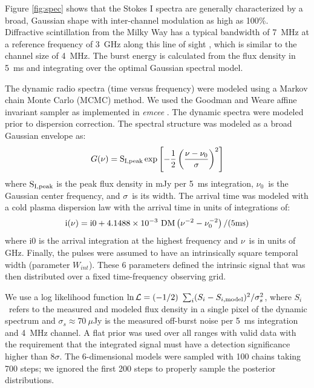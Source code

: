 \documentclass[twocolumn]{aastex61}
\begin{document}
Figure \ref{fig:spec} shows that the Stokes I spectra are generally characterized by a broad, Gaussian shape with inter-channel modulation as high as 100\%. Diffractive scintillation from the Milky Way has a typical bandwidth of 7~MHz at a reference frequency of 3~GHz along this line of sight \citep{2002astro.ph..7156C}, which is similar to the channel size of 4~MHz. The burst energy is calculated from the flux density in 5~ms and integrating over the optimal Gaussian spectral model.

The dynamic radio spectra (time versus frequency) were modeled using a Markov chain Monte Carlo (MCMC) method. We used the Goodman and Weare affine invariant sampler \citep{goodman2010ensemble} as implemented in \emph{emcee} \citep{2013PASP..125..306F}. The dynamic spectra were modeled prior to dispersion correction. The spectral structure was modeled as a broad Gaussian envelope as:
\begin{equation}
G(\nu) = \rm{S}_{I,peak} \exp{\left[-\frac{1}{2} \left(\frac{\nu - \nu_0}{\sigma}\right)^2\right]}
\end{equation}
\noindent where $\rm{S}_{I,peak}$ is the peak flux density in mJy per 5~ms integration, $\nu_0$\ is the Gaussian center frequency, and $\sigma$\ is its width. The arrival time was modeled with a cold plasma dispersion law with the arrival time in units of integrations of:
\begin{equation}
\rm{i} (\nu) = \rm{i0} + 4.1488\times10^{-3}\ \rm{DM} \left(\nu^{-2} - \nu_0^{-2}\right)/(5 \rm{ms})
\end{equation}
\noindent where i0 is the arrival integration at the highest frequency and $\nu$\ is in units of GHz. Finally, the pulses were assumed to have an intrinsically square temporal width (parameter $W_{int}$). These 6 parameters defined the intrinsic signal that was then distributed over a fixed time-frequency observing grid.

We use a log likelihood function $\ln \mathcal{L}=(-1/2)\ \sum_i (S_i - S_{i, \rm{model}})^2/\sigma_s^2$, where $S_i$\ refers to the measured and modeled flux density in a single pixel of the dynamic spectrum and $\sigma_s\approx 70~\mu$Jy is the measured off-burst noise per 5~ms integration and 4~MHz channel. A flat prior was used over all ranges with valid data with the requirement that the integrated signal must have a detection significance higher than 8$\sigma$. The 6-dimensional models were sampled with 100 chains taking 700 steps; we ignored the first 200 steps to properly sample the posterior distributions. 
\end{document}
